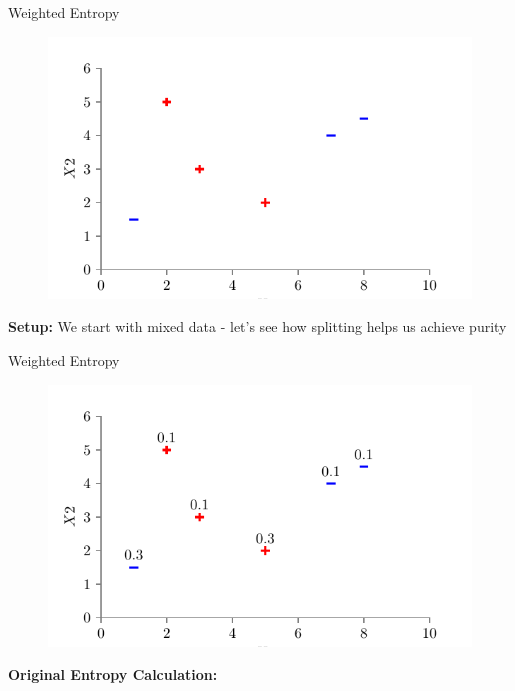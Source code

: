 \documentclass[usenames,dvipsnames]{beamer}
\begin{document}
\begin{frame}{Weighted Entropy}
\begin{figure}
    \centering
    \includegraphics[scale=0.8]{../assets/decision-trees/figures/dt_weighted/fig1.pdf}
\end{figure}
\textbf{Setup:} We start with mixed data - let's see how splitting helps us achieve purity
\end{frame}

\begin{frame}{Weighted Entropy}
\begin{figure}
    \centering
    \includegraphics[scale=0.8]{../assets/decision-trees/figures/dt_weighted/fig2.pdf}
\end{figure}
\textbf{Original Entropy Calculation:}
\end{frame}
	
\end{document}
